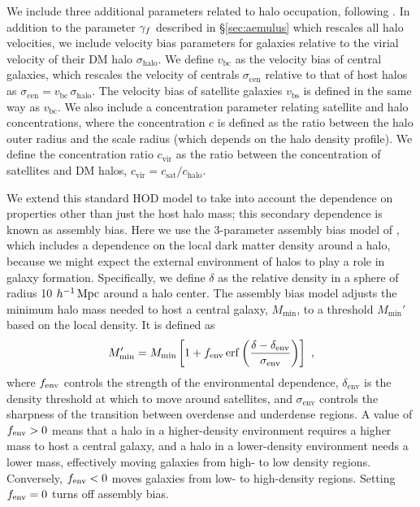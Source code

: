We include three additional parameters related to halo occupation, following \cite{Zhai2019}.
In addition to the parameter $\gamma_f$ described in \S\ref{sec:aemulus} which rescales all halo velocities, we include velocity bias parameters for galaxies relative to the virial velocity of their DM halo $\sigma_\mathrm{halo}$.
We define $v_\mathrm{bc}$ as the velocity bias of central galaxies, which rescales the velocity of centrals $\sigma_\mathrm{cen}$ relative to that of host halos as $\sigma_\mathrm{cen} = v_\mathrm{bc} \,\sigma_\mathrm{halo}$.
The velocity bias of satellite galaxies $v_\mathrm{bs}$ is defined in the same way as $v_\mathrm{bc}$.
We also include a concentration parameter relating satellite and halo concentrations, where the concentration $c$ is defined as the ratio between the halo outer radius and the scale radius (which depends on the halo density profile).
We define the concentration ratio $c_\mathrm{vir}$ as the ratio between the concentration of satellites and DM halos, $c_\mathrm{vir} = c_\mathrm{sat}/c_\mathrm{halo}$.

We extend this standard HOD model to take into account the dependence on properties other than just the host halo mass; this secondary dependence is known as assembly bias.
Here we use the 3-parameter assembly bias model of \cite{WalshTinker2019}, which includes a dependence on the local dark matter density around a halo, because we might expect the external environment of halos to play a role in galaxy formation.
Specifically, we define $\delta$ as the relative density in a sphere of radius 10 $h^{-1}\,\mathrm{Mpc}$ around a halo center.
The assembly bias model adjusts the minimum halo mass needed to host a central galaxy, $M_\mathrm{min}$, to a threshold $M_\mathrm{min}'$ based on the local density.
It is defined as
\begin{equation}
	M_\mathrm{min}' = M_\mathrm{min} \left[ 1 + f_\mathrm{env} \, \mathrm{erf}
	\left(\frac{ \delta - \delta_\mathrm{env} }{\sigma_\mathrm{env}}\right) \right] ~,
\end{equation}
where $f_\mathrm{env}$ controls the strength of the environmental dependence, $\delta_\mathrm{env}$ is the density threshold at which to move around satellites, and $\sigma_\mathrm{env}$ controls the sharpness of the transition between overdense and underdense regions.
A value of $f_\mathrm{env} > 0$ means that a halo in a higher-density environment requires a higher mass to host a central galaxy, and a halo in a lower-density environment needs a lower mass, effectively moving galaxies from high- to low density regions.
Conversely, $f_\mathrm{env} < 0$ moves galaxies from low- to high-density regions.
Setting $f_\mathrm{env} = 0$ turns off assembly bias.

